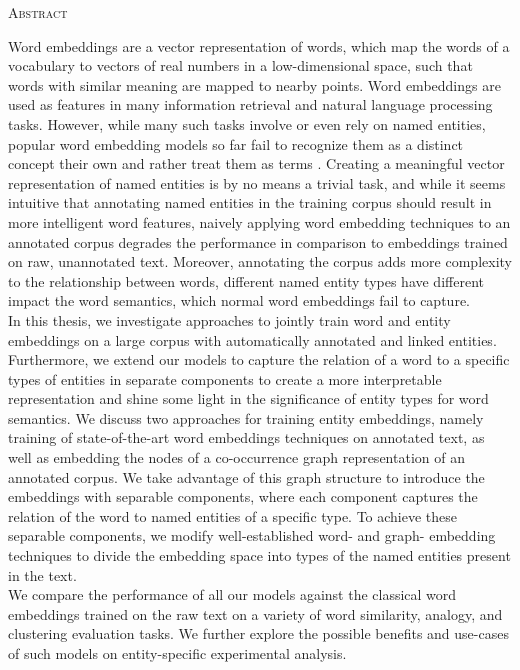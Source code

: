 \begin{center}
  \textsc{Abstract}
\end{center}
%
\noindent
%
Word embeddings are a vector representation of words, which map the words of a vocabulary to vectors of real numbers in a low-dimensional space, such that words with similar meaning are mapped to nearby points. Word embeddings are used as features in many information retrieval and natural language processing tasks. However, while many such tasks involve or even rely on named entities, popular word embedding models so far fail to recognize them as a distinct concept their own and rather treat them as terms . Creating a meaningful vector representation of named entities is by no means a trivial task, and while it seems intuitive that annotating named entities in the training corpus should result in more intelligent word features, naively applying word embedding techniques to an annotated corpus degrades the performance in comparison to embeddings trained on raw, unannotated text. Moreover, annotating the corpus adds more complexity to the relationship between words, different named entity types have different impact the word semantics, which normal word embeddings fail to capture.
\\
In this thesis, we investigate approaches to jointly train word and entity embeddings on a large corpus with automatically annotated and linked entities. Furthermore, we extend our models to capture the relation of a word to a specific types of entities in separate components to create a more interpretable representation and shine some light in the significance of entity types for word semantics. We discuss two approaches for training entity embeddings, namely training of state-of-the-art word embeddings techniques on annotated text, as well as embedding the nodes of a co-occurrence graph representation of an annotated corpus. We take advantage of this graph structure to introduce the embeddings with separable components, where each component captures the relation of the word to named entities of a specific type. To achieve these separable components, we modify well-established word- and graph- embedding techniques to divide the embedding space into types of the named entities present in the text. \\
We compare the performance of all our models against the classical word embeddings trained on the raw text on a variety of word similarity, analogy, and clustering evaluation tasks. We further explore the possible benefits and use-cases of such models on entity-specific experimental analysis. 

